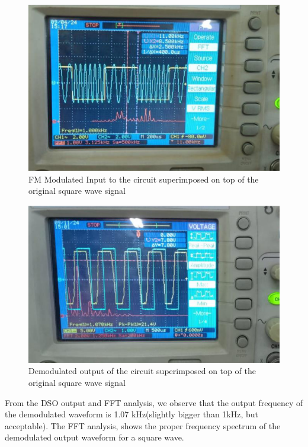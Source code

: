 \documentclass{article}
\begin{document}
\begin{figure}[!ht]
\includegraphics[width=\textwidth]{Input_sq.png}
\caption{FM Modulated Input to the circuit superimposed on top of the original square wave signal}
\label{fig:inp_sq}
\end{figure}

\begin{figure}[!ht]
\includegraphics[width=\textwidth]{Output_sq.png}
\caption{Demodulated output of the circuit superimposed on top of the original square wave signal}
\label{fig:out_sq}
\end{figure}

From the DSO output and FFT analysis, we observe that the output frequency of the demodulated waveform is 1.07 kHz(slightly bigger than 1kHz, but acceptable). The FFT analysis, shows the proper frequency spectrum of the demodulated output waveform for a square wave.
\clearpage
\end{document}

